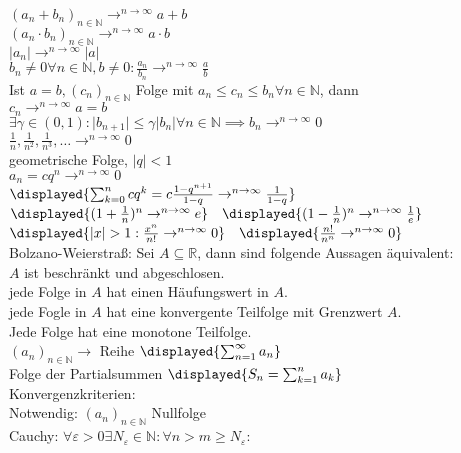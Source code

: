 \documentclass[9pt, landscape,a4paper]{extarticle}
\newcommand*\abs[1]{\lvert#1\rvert}
\newcommand\eps{\varepsilon}
\begin{document}
\begin{multicols*}{4}
    $(a_n + b_n)_{n \in\mathbb{N}} \to^{n\rightarrow\infty} a + b$ \\
    $(a_n \cdot b_n)_{n \in\mathbb{N}} \to^{n\rightarrow\infty} a \cdot b$ \\
    $\abs{a_n} \to^{n\rightarrow \infty} \abs{a}$ \\
    $b_n \neq 0 \forall n\in \mathbb{N}, b\neq 0: \frac{a_n}{b_n} \to^{n\rightarrow \infty} \frac{a}{b}$ \\
    Ist $a = b, (c_n)_{n\in\mathbb{N}}$ Folge mit $a_n \leq c_n \leq b_n \forall n\in\mathbb{N}$, dann \\
    $c_n \to^{n\rightarrow\infty} a = b$ \\
  $\exists \gamma \in (0,1):\abs{b_{n + 1}} \leq \gamma \abs{b_n} \forall n\in\mathbb{N} \implies  b_n \to^{n\rightarrow \infty} 0$ \\
  $\frac{1}{n}, \frac{1}{n^2},\frac{1}{n^3},\dots \to^{n\rightarrow \infty} 0$ \\
  geometrische Folge, $\abs{q} < 1$ \\
  $a_n = c q^n \to^{n\rightarrow \infty} 0$ \\
  $\displayed{\sum_{k = 0}^n cq^k = c\frac{1 - q^{n + 1}}{1 - q} \to^{n\rightarrow \infty} \frac{1}{1 - q}}$ \\
  $\displayed{(1 + \frac{1}{n})^n \to^{n\rightarrow \infty} e}\quad\displayed{(1 - \frac{1}{n})^n \to^{n\rightarrow \infty} \frac{1}{e}}$ \\
  $\displayed{\abs{x} > 1: \frac{x^n}{n!} \to^{n\rightarrow \infty} 0}\quad\displayed{\frac{n!}{n^n} \to^{n\rightarrow \infty} 0}$ \\
  Bolzano-Weierstraß: Sei $A\subseteq \mathbb{R}$, dann sind folgende Aussagen äquivalent: \\
  $A$ ist beschränkt und abgeschlosen. \\
  jede Folge in $A$ hat einen Häufungswert in $A$. \\
  jede Fogle in $A$ hat eine konvergente Teilfolge mit Grenzwert $A$. \\
  Jede Folge hat eine monotone Teilfolge. \\
  $(a_n)_{n\in\mathbb{N}} \to$ Reihe $\displayed{\sum_{n = 1}^\infty a_n}$ \\
  Folge der Partialsummen $\displayed{S_n = \sum_{k = 1}^n a_k}$ \\
  Konvergenzkriterien: \\
  Notwendig: $(a_n)_{n\in\mathbb{N}}$ Nullfolge \\
  Cauchy: $\forall\eps > 0\exists N_\eps \in \mathbb{N}: \forall n > m \geq N_\eps$: \\

\end{multicols*}
\end{document}
